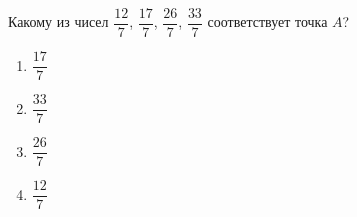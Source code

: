 \begin{ex}
	Какому из чисел $\dfrac{12}{7}$, $\dfrac{17}{7}$, $\dfrac{26}{7}$, $\dfrac{33}{7}$ соответствует точка $A$?
	
	\selectanswer
	\begin{multicols}{4}
		\begin{enumerate}[label=\arabic*)]
			\item $\dfrac{17}{7}$
			\item $\dfrac{33}{7}$
			\item $\dfrac{26}{7}$
			\item $\dfrac{12}{7}$
		\end{enumerate}
	\end{multicols}
\end{ex}